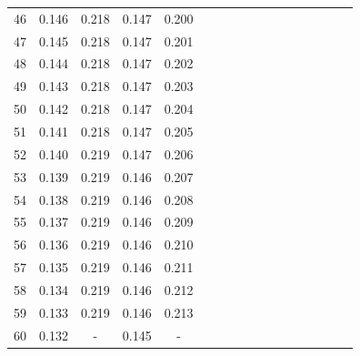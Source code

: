\documentclass{report}
\begin{document}
\begin{table}
\begin{tabular}{|c|cccc|cccc|cccc|cccc|}
46 & 0.146 & 0.218 & 0.147 & 0.200 & & & & & & & & & & & &\\
47 & 0.145 & 0.218 & 0.147 & 0.201 & & & & & & & & & & & &\\
48 & 0.144 & 0.218 & 0.147 & 0.202 & & & & & & & & & & & &\\
49 & 0.143 & 0.218 & 0.147 & 0.203 & & & & & & & & & & & &\\
50 & 0.142 & 0.218 & 0.147 & 0.204 & & & & & & & & & & & &\\
51 & 0.141 & 0.218 & 0.147 & 0.205 & & & & & & & & & & & &\\
52 & 0.140 & 0.219 & 0.147 & 0.206 & & & & & & & & & & & &\\
53 & 0.139 & 0.219 & 0.146 & 0.207 & & & & & & & & & & & &\\
54 & 0.138 & 0.219 & 0.146 & 0.208 & & & & & & & & & & & &\\
55 & 0.137 & 0.219 & 0.146 & 0.209 & & & & & & & & & & & &\\
56 & 0.136 & 0.219 & 0.146 & 0.210 & & & & & & & & & & & &\\
57 & 0.135 & 0.219 & 0.146 & 0.211 & & & & & & & & & & & &\\
58 & 0.134 & 0.219 & 0.146 & 0.212 & & & & & & & & & & & &\\
59 & 0.133 & 0.219 & 0.146 & 0.213 & & & & & & & & & & & &\\
60 & 0.132 &   -   & 0.145 &   -   & & & & & & & & & & & &\\
\hline
\end{tabular}
\end{table}
\end{document}
